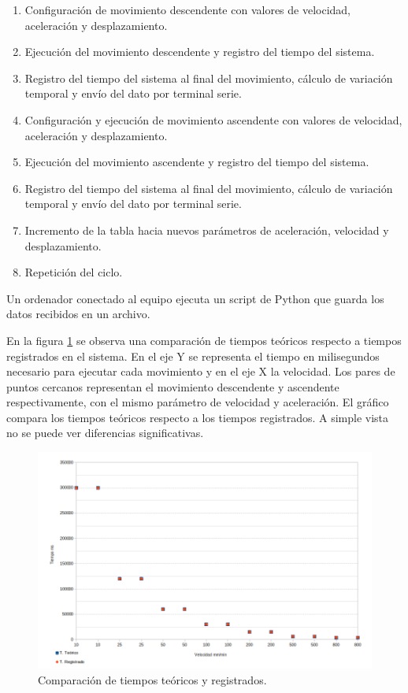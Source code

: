 \begin{enumerate}
\item Configuración de movimiento descendente con valores de velocidad, aceleración y desplazamiento.
\item Ejecución del movimiento descendente y registro del tiempo del sistema.
\item Registro del tiempo del sistema al final del movimiento, cálculo de variación temporal y envío del dato por terminal serie.
\item Configuración y ejecución de movimiento ascendente con valores de velocidad, aceleración y desplazamiento.
\item Ejecución del movimiento ascendente y registro del tiempo del sistema.
\item Registro del tiempo del sistema al final del movimiento, cálculo de variación temporal y envío del dato por terminal serie.
\item Incremento de la tabla hacia nuevos parámetros de aceleración, velocidad y desplazamiento.
\item Repetición del ciclo.
\end{enumerate}

Un ordenador conectado al equipo ejecuta un script de Python que guarda los datos recibidos en un archivo.

En la figura \ref{fig:tiempo_movimiento_1} se observa una comparación de tiempos teóricos respecto a  tiempos registrados en el sistema. En el eje Y se representa el tiempo en milisegundos necesario para ejecutar cada movimiento y en el eje X la velocidad. Los pares de puntos cercanos representan el movimiento descendente y ascendente respectivamente, con el mismo parámetro de velocidad y aceleración. El gráfico compara los tiempos teóricos respecto a los tiempos registrados. A simple vista no se puede ver diferencias significativas.

\begin{figure}[h!]
\centering 
\includegraphics[width=1\textwidth]{./Figures/tiempo_movimiento_1.png}
\caption{Comparación de tiempos teóricos y registrados.}
\label{fig:tiempo_movimiento_1}
\end{figure}

